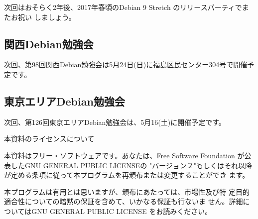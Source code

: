 \documentclass[mingoth,a4paper]{jsarticle}
\begin{document}
次回はおそらく2年後、2017年春頃のDebian 9 Stretch のリリースパーティでまたお祝い
しましょう。


\subsection{関西Debian勉強会}
次回、第98回関西Debian勉強会は5月24日(日)に福島区民センター304号で開催予定です。

\subsection{東京エリアDebian勉強会}
次回、第126回東京エリアDebian勉強会は、5月16(土)に開催予定です。

%

\pagebreak

\begin{center}
本資料のライセンスについて
\end{center}

本資料はフリー・ソフトウェアです。あなたは、Free Software
Foundation が公表したGNU GENERAL PUBLIC LICENSEの "バージョン２"もしくはそれ以降
が定める条項に従って本プログラムを再頒布または変更することができ
ます。

本プログラムは有用とは思いますが、頒布にあたっては、市場性及び特
定目的適合性についての暗黙の保証を含めて、いかなる保証も行ないま
せん。詳細についてはGNU GENERAL PUBLIC LICENSE をお読みください。
\end{document}
